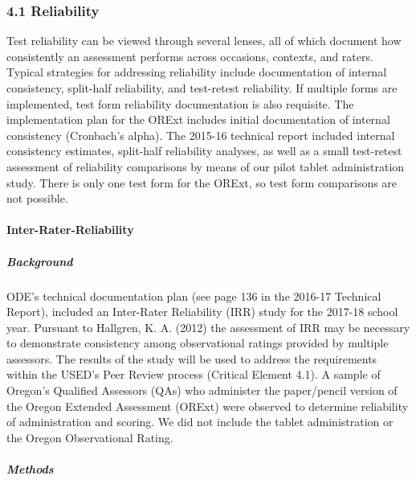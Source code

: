 \documentclass[]{article}
\let\oldparagraph\paragraph
\renewcommand{\paragraph}[1]{\oldparagraph{#1}\mbox{}}
\let\oldsubparagraph\subparagraph
\renewcommand{\subparagraph}[1]{\oldsubparagraph{#1}\mbox{}}
\begin{document}
\subsubsection{4.1 Reliability}\label{reliability}

Test reliability can be viewed through several lenses, all of which
document how consistently an assessment performs across occasions,
contexts, and raters. Typical strategies for addressing reliability
include documentation of internal consistency, split-half reliability,
and test-retest reliability. If multiple forms are implemented, test
form reliability documentation is also requisite. The implementation
plan for the ORExt includes initial documentation of internal
consistency (Cronbach's alpha). The 2015-16 technical report included
internal consistency estimates, split-half reliability analyses, as well
as a small test-retest assessment of reliability comparisons by means of
our pilot tablet administration study. There is only one test form for
the ORExt, so test form comparisons are not possible.

\paragraph{Inter-Rater-Reliability}\label{inter-rater-reliability}

\subparagraph{Background}\label{background}

ODE's technical documentation plan (see page 136 in the 2016-17
Technical Report), included an Inter-Rater Reliability (IRR) study for
the 2017-18 school year. Pursuant to Hallgren, K. A. (2012) the
assessment of IRR may be necessary to demonstrate consistency among
observational ratings provided by multiple assessors. The results of the
study will be used to address the requirements within the USED's Peer
Review process (Critical Element 4.1). A sample of Oregon's Qualified
Assessors (QAs) who administer the paper/pencil version of the Oregon
Extended Assessment (ORExt) were observed to determine reliability of
administration and scoring. We did not include the tablet administration
or the Oregon Observational Rating.

\subparagraph{Methods}\label{methods}
\end{document}
